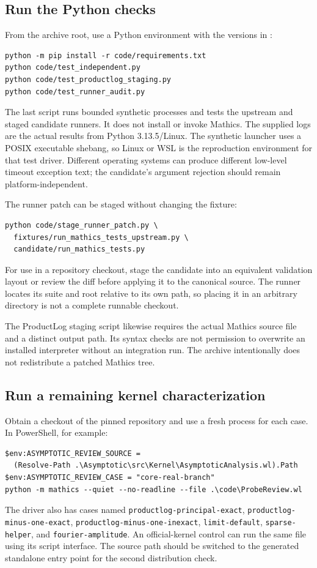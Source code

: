 \documentclass[11pt,a4paper]{article}
\newcommand{\code}[1]{\texttt{#1}}
\newcommand{\src}[2]{\href{https://github.com/VladimirReshetnikov/Asymptotic/blob/7d1bc832895cc90a9b2a978b7b7684acab908bd2/#1}{#2}}
\begin{document}
\subsection{Run the Python checks}
From the archive root, use a Python environment with the versions in :
\begin{lstlisting}
python -m pip install -r code/requirements.txt
python code/test_independent.py
python code/test_productlog_staging.py
python code/test_runner_audit.py
\end{lstlisting}
The last script runs bounded synthetic processes and tests the upstream and staged candidate runners. It does not install or invoke Mathics. The supplied logs are the actual results from Python 3.13.5/Linux. The synthetic launcher uses a POSIX executable shebang, so Linux or WSL is the reproduction environment for that test driver. Different operating systems can produce different low-level timeout exception text; the candidate's argument rejection should remain platform-independent.

The runner patch can be staged without changing the fixture:
\begin{lstlisting}
python code/stage_runner_patch.py \
  fixtures/run_mathics_tests_upstream.py \
  candidate/run_mathics_tests.py
\end{lstlisting}
For use in a repository checkout, stage the candidate into an equivalent validation layout or review the diff before applying it to the canonical source. The runner locates its suite and root relative to its own path, so placing it in an arbitrary directory is not a complete runnable checkout.

The ProductLog staging script likewise requires the actual Mathics source file and a distinct output path. Its syntax checks are not permission to overwrite an installed interpreter without an integration run. The archive intentionally does not redistribute a patched Mathics tree.

\subsection{Run a remaining kernel characterization}
Obtain a checkout of the pinned repository and use a fresh process for each case. In PowerShell, for example:
\begin{lstlisting}
$env:ASYMPTOTIC_REVIEW_SOURCE =
  (Resolve-Path .\Asymptotic\src\Kernel\AsymptoticAnalysis.wl).Path
$env:ASYMPTOTIC_REVIEW_CASE = "core-real-branch"
python -m mathics --quiet --no-readline --file .\code\ProbeReview.wl
\end{lstlisting}
The driver also has cases named \code{productlog-principal-exact}, \code{productlog-minus-one-exact}, \code{productlog-minus-one-inexact}, \code{limit-default}, \code{sparse-helper}, and \code{fourier-amplitude}. An official-kernel control can run the same file using its script interface. The source path should be switched to the generated standalone entry point for the second distribution check.
\end{document}
